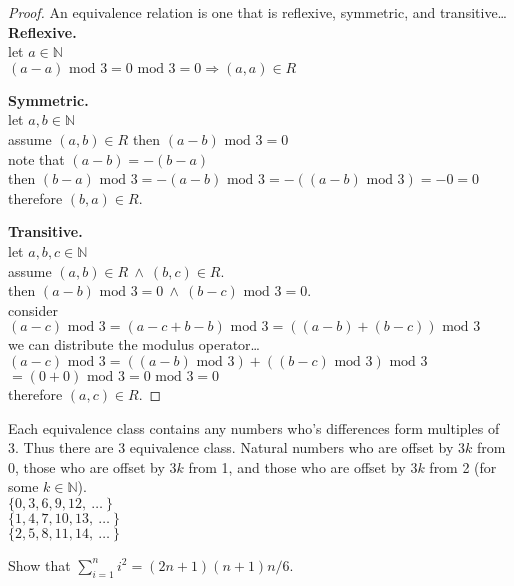 \documentclass[12pt]{jhwhw}
\begin{document}
\solution
\begin{proof} An equivalence relation is one that is reflexive, symmetric, and transitive\dots \\

\bigbreak
\textbf{Reflexive.} \\
	let $a\in \mathbb{N}$ \\
	$(a - a) \text{ mod }3 = 0 \text{ mod } 3 = 0 \Rightarrow (a, a) \in R$

\bigbreak
\textbf{Symmetric.} \\
	let $a,b\in \mathbb{N}$ \\
	assume $(a,b)\in R$ then $(a-b) \text{ mod } 3 = 0$ \\
	note that $(a-b) = -(b-a)$ \\
	then $(b-a) \text{ mod } 3 = -(a-b) \text{ mod } 3 = -((a-b) \text{ mod } 3) = -0 = 0$ \\
	therefore $(b,a) \in R$.

\bigbreak
\textbf{Transitive.} \\
	let $a,b,c\in \mathbb{N}$ \\
	assume $(a,b)\in R\ \wedge\ (b,c)\in R$. \\
	then $(a-b) \text{ mod } 3 = 0\ \wedge\ (b-c) \text{ mod } 3 = 0$. \\
	consider $(a-c) \text{ mod } 3 = (a-c+b-b) \text{ mod } 3 = ((a-b)+(b-c)) \text{ mod } 3$ \\
	we can distribute the modulus operator\dots \\
	$(a-c)\text{ mod }3 = ((a-b)\text{ mod }3)+((b-c)\text{ mod }3)\text{ mod }3$ \\
	$= (0 + 0)\text{ mod }3 = 0\text{ mod }3 = 0$ \\
	therefore $(a,c)\in R$.

\end{proof}

Each equivalence class contains any numbers who's differences form multiples of 3.
Thus there are 3 equivalence class. Natural numbers who are offset by $3k$ from 0, those who are offset by $3k$
from 1, and those who are offset by $3k$ from 2 (for some $k \in \mathbb{N}$). \\
$\{0, 3, 6, 9, 12,\ \dots\ \}$ \\
$\{1, 4, 7, 10, 13,\ \dots\ \}$ \\
$\{2, 5, 8, 11, 14,\ \dots\ \}$ \\

\problem{}

	Show that $\sum_{i=1}^{n} i^{2} = (2n+1)(n+1)n/6$.
\end{document}
